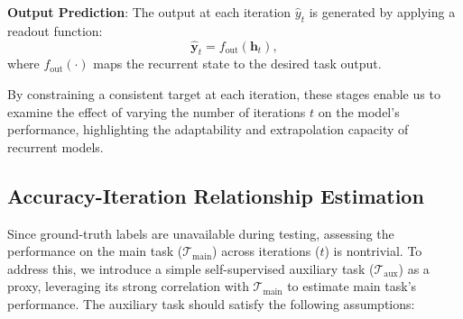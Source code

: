 


\textbf{Output Prediction}: The output at each iteration \( \hat{y}_t \) is generated by applying a readout function:
   \begin{equation}
       \hat{\mathbf{y}}_t = f_\text{out}(\mathbf{h}_t),
   \end{equation}
   where \( f_\text{out}(\cdot) \) maps the recurrent state to the desired task output.
\label{output_pred}

By constraining a consistent target at each iteration, these stages enable us to examine the effect of varying the number of iterations $t$ on the model's performance, highlighting the adaptability and extrapolation capacity of recurrent models.

\subsection{Accuracy-Iteration Relationship Estimation}

Since ground-truth labels are unavailable during testing, assessing the performance on the main task ($\mathcal{T}_\text{main}$) across iterations ($t$) is nontrivial. 
To address this, we introduce a simple self-supervised auxiliary task ($\mathcal{T}_\text{aux}$) as a proxy, leveraging its strong correlation with $\mathcal{T}_\text{main}$ to estimate main task's performance.
The auxiliary task should satisfy the following assumptions: 

